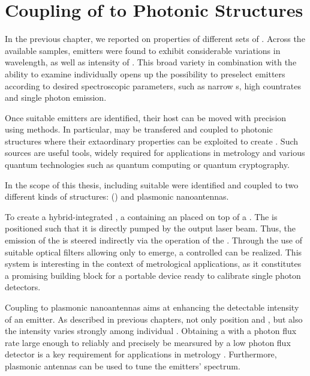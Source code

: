
\chapter{Coupling of \Nds to Photonic Structures}	\label{ch::coupling}

	In the previous chapter, we reported on \pl properties of different sets of \sivs. 
	Across the available samples, emitters were found to exhibit considerable variations in wavelength, \lw as well as intensity of \zpls. 
	This broad variety in combination with the ability to examine \sivs individually opens up the possibility to preselect emitters according to desired spectroscopic parameters, such as narrow \lw{}s, high countrates and single photon emission. 

	Once suitable emitters are identified, their host \nds can be moved with precision using \pp methods. 
	In particular, \sivs may be transfered and coupled to photonic structures where their extaordinary properties can be exploited to create \sps. 
	Such sources are useful tools, widely required for applications in metrology and various quantum technologies such as quantum computing or quantum cryptography.

	In the scope of this thesis, \nds including suitable \sivs were identified and coupled to two different kinds of structures: \Vcsels (\VCSELs) and plasmonic nanoantennas.

	To create a hybrid-integrated \sps, a \nd containing an \siv placed on top of a \VCSEL. The \siv is positioned such that it is directly pumped by the \VCSEL output laser beam. Thus, the emission of the \siv is steered indirectly via the operation of the \VCSEL. Through the use of suitable optical filters allowing only \siv \fl to emerge, a controlled \sps can be realized. This system is interesting in the context of metrological applications, as it constitutes a promising building block for a portable device ready to calibrate single photon detectors.

	Coupling \sivs to plasmonic nanoantennas aims at enhancing the detectable \pl intensity of an emitter. 
	As described in previous chapters, not only \ZPL position and \lw, but also the \pl intensity varies strongly among individual \sivs.
	Obtaining a \sps with a photon flux rate large enough to reliably and precisely be mearsured by a low photon flux detector is a key requirement for applications in metrology \cite{Vaigu2017}.
	Furthermore, plasmonic antennas can be used to tune the emitters' \pl spectrum.



